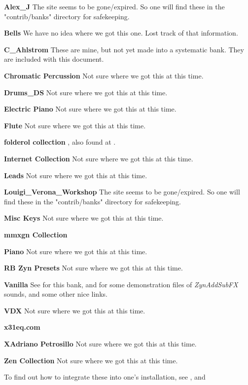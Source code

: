   \begin{enumber}
      \item \textbf{Alex\_J}
         The site seems to be gone/expired. So one will find these in the
         "contrib/banks" directory for safekeeping.
      \item \textbf{Bells}
         We have no idea where we got this one.
         Lost track of that information.
      \item \textbf{C\_Ahlstrom}
         These are mine, but not yet made into a systematic bank.
         They are included with this document.
      \item \textbf{Chromatic Percussion}
         Not sure where we got this at this time.
      \item \textbf{Drums\_DS}
         Not sure where we got this at this time.
      \item \textbf{Electric Piano}
         Not sure where we got this at this time.
      \item \textbf{Flute}
         Not sure where we got this at this time.
      \item \textbf{folderol collection}
         \cite{folderol}, also found at \cite{zyndemos}.
      \item \textbf{Internet Collection}
         Not sure where we got this at this time.
      \item \textbf{Leads}
         Not sure where we got this at this time.
      \item \textbf{Louigi\_Verona\_Workshop}
         The site seems to be gone/expired. So one will find these in the
         "contrib/banks" directory for safekeeping.
      \item \textbf{Misc Keys}
         Not sure where we got this at this time.
      \item \textbf{mmxgn Collection} \cite{mmxgn}
      \item \textbf{Piano}
         Not sure where we got this at this time.
      \item \textbf{RB Zyn Presets}
         Not sure where we got this at this time.
      \item \textbf{Vanilla}
         See \cite{zyndemos} for this bank, and for some demonstration files
         of \textsl{ZynAddSubFX} sounds, and some other nice links.
      \item \textbf{VDX}
         Not sure where we got this at this time.
      \item \textbf{x31eq.com} \cite{x31eq}
      \item \textbf{XAdriano Petrosillo}
         Not sure where we got this at this time.
      \item \textbf{Zen Collection}
         Not sure where we got this at this time.
   \end{enumber}

   To find out how to integrate these into one's installation, see
   , and

